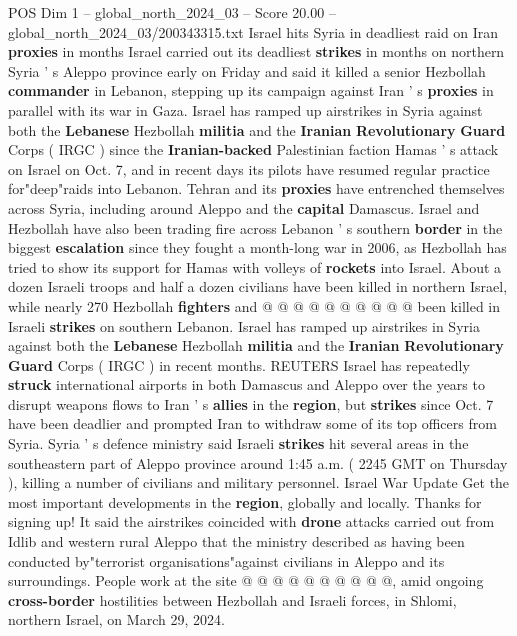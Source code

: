 \begin{textsample}{POS Dim 1 – global\_north\_2024\_03 – Score 20.00 – global\_north\_2024\_03/200343315.txt}  \label{ex:f1_pos_383}
Israel hits Syria in deadliest raid on Iran \textbf{proxies} in months Israel carried out its deadliest \textbf{strikes} in months on northern Syria ' s Aleppo province early on Friday and said it killed a senior Hezbollah \textbf{commander} in Lebanon, stepping up its campaign against Iran ' s \textbf{proxies} in parallel with its war in Gaza.
Israel has ramped up airstrikes in Syria against both the \textbf{Lebanese} Hezbollah \textbf{militia} and the \textbf{Iranian} \textbf{Revolutionary} \textbf{Guard} Corps ( IRGC ) since the \textbf{Iranian-backed} Palestinian faction Hamas ' s attack on Israel on Oct. 7, and in recent days its pilots have resumed regular practice for"deep"raids into Lebanon.
Tehran and its \textbf{proxies} have entrenched themselves across Syria, including around Aleppo and the \textbf{capital} Damascus.
Israel and Hezbollah have also been trading fire across Lebanon ' s southern \textbf{border} in the biggest \textbf{escalation} since they fought a month-long war in 2006, as Hezbollah has tried to show its support for Hamas with volleys of \textbf{rockets} into Israel.
About a dozen Israeli troops and half a dozen civilians have been killed in northern Israel, while nearly 270 Hezbollah \textbf{fighters} and @ @ @ @ @ @ @ @ @ @ been killed in Israeli \textbf{strikes} on southern Lebanon.
Israel has ramped up airstrikes in Syria against both the \textbf{Lebanese} Hezbollah \textbf{militia} and the \textbf{Iranian} \textbf{Revolutionary} \textbf{Guard} Corps ( IRGC ) in recent months.
REUTERS Israel has repeatedly \textbf{struck} international airports in both Damascus and Aleppo over the years to disrupt weapons flows to Iran ' s \textbf{allies} in the \textbf{region}, but \textbf{strikes} since Oct. 7 have been deadlier and prompted Iran to withdraw some of its top officers from Syria.
Syria ' s defence ministry said Israeli \textbf{strikes} hit several areas in the southeastern part of Aleppo province around 1:45 a.m. ( 2245 GMT on Thursday ), killing a number of civilians and military personnel.
Israel War Update Get the most important developments in the \textbf{region}, globally and locally.
Thanks for signing up!
It said the airstrikes coincided with \textbf{drone} attacks carried out from Idlib and western rural Aleppo that the ministry described as having been conducted by"terrorist organisations"against civilians in Aleppo and its surroundings.
People work at the site @ @ @ @ @ @ @ @ @ @, amid ongoing \textbf{cross-border} hostilities between Hezbollah and Israeli forces, in Shlomi, northern Israel, on March 29, 2024.

\end{textsample}
